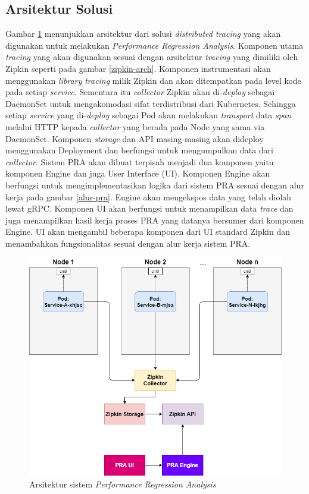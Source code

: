 \subsection{Arsitektur Solusi}

Gambar \ref{arch-pra} menunjukkan arsitektur dari solusi \textit{distributed tracing} yang akan digunakan untuk melakukan \textit{Performance Regression Analysis}. Komponen utama \textit{tracing} yang akan digunakan sesuai dengan arsitektur \textit{tracing} yang dimiliki oleh Zipkin seperti pada gambar \ref{zipkin-arch}. Komponen instrumentasi akan menggunakan \textit{library} \textit{tracing} milik Zipkin dan akan ditempatkan pada level kode pada setiap \textit{service}. Sementara itu \textit{collector} Zipkin akan di-\textit{deploy} sebagai DaemonSet untuk mengakomodasi sifat terdistribusi dari Kubernetes. Sehingga setiap \textit{service} yang di-\textit{deploy} sebagai Pod akan melakukan \textit{transport} data \textit{span} melalui HTTP kepada \textit{collector} yang berada pada Node yang sama via DaemonSet. Komponen \textit{storage} dan API masing-masing akan dideploy menggunakan Deployment dan berfungsi untuk mengumpulkan data dari \textit{collector}. Sistem PRA akan dibuat terpisah menjadi dua komponen yaitu komponen Engine dan juga User Interface (UI). Komponen Engine akan berfungsi untuk mengimplementasikan logika dari sistem PRA sesuai dengan alur kerja pada gambar \ref{alur-pra}. Engine akan mengekspos data yang telah diolah lewat gRPC. Komponen UI akan berfungsi untuk menampilkan data \textit{trace} dan juga menampilkan hasil kerja proses PRA yang datanya bersumer dari komponen Engine. UI akan mengambil beberapa komponen dari UI standard Zipkin dan menambahkan fungsionalitas sesuai dengan alur kerja sistem PRA.

\begin{figure}[!htb]
	\centering
	\includegraphics[width=1\textwidth]{resources/ch3/arch.png}
	\caption{Arsitektur sistem \textit{Performance Regression Analysis}}
	\label{arch-pra}
\end{figure}

